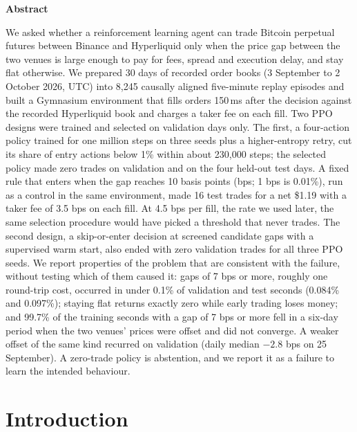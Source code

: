\documentclass[12pt,a4paper]{article}
\DeclareRobustCommand{\bps}{\ifmmode\,\text{bps}\else\,bps\fi}
\begin{document}
\setcounter{page}{1}

\label{bodystart}
\begin{center}{\large\bfseries Abstract}\end{center}
\vspace{-4pt}
We asked whether a reinforcement learning agent can trade Bitcoin perpetual futures
between Binance and Hyperliquid only when the price gap between the two venues is large
enough to pay for fees, spread and execution delay, and stay flat otherwise. We prepared
30 days of recorded order books (3 September to 2 October 2026, UTC) into 8,245 causally
aligned five-minute replay episodes and built a Gymnasium environment that fills orders
150\,ms after the decision against the recorded Hyperliquid book and charges a taker fee on
each fill. Two PPO designs were trained and selected on validation days only. The first, a
four-action policy trained for one million steps on three seeds plus a higher-entropy retry,
cut its share of entry actions below 1\% within about 230,000 steps; the selected policy made
zero trades on validation and on the four held-out test days. A fixed rule that enters when
the gap reaches 10 basis points (bps; 1\bps{} is 0.01\%), run as a control in the same
environment, made 16 test trades for a net \$1.19 with a taker fee of 3.5\bps{} on each fill.
At 4.5\bps{} per fill, the rate we used later, the same selection procedure would have
picked a threshold that never trades. The second design, a skip-or-enter decision at screened
candidate gaps with a supervised warm start, also ended with zero validation trades for all
three PPO seeds. We report properties of the problem that are consistent with the failure,
without testing which of them caused it: gaps of 7\bps{} or more, roughly one round-trip
cost, occurred in under 0.1\% of validation and test seconds (0.084\% and 0.097\%); staying
flat returns exactly zero while early trading loses money; and 99.7\% of the training seconds
with a gap of 7\bps{} or more fell in a six-day period when the two venues' prices were offset
and did not converge. A weaker offset of the same kind recurred on validation (daily median
$-2.8$\bps{} on 25 September). A zero-trade policy is abstention, and we report it as a failure
to learn the intended behaviour.

\section{Introduction}\label{sec:intro}
\end{document}
